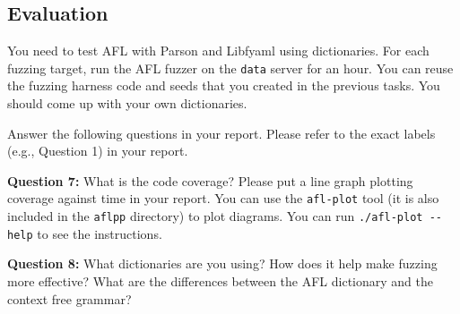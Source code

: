 \documentclass[letterpaper,11pt]{article}
\begin{document}




\subsection{Evaluation}

You need to test AFL with Parson and Libfyaml using dictionaries.
For each fuzzing target, run the AFL fuzzer on the \texttt{data} server for an hour.
You can reuse the fuzzing harness code and seeds that you created in the previous tasks.
You should come up with your own dictionaries.

Answer the following questions in your report. Please refer to the exact labels (e.g., Question 1) in your report.

\textbf{Question 7:}
What is the code coverage?
Please put a line graph plotting coverage against time in your report.
You can use the \texttt{afl-plot} tool (it is also included in the \texttt{aflpp} directory) to plot diagrams. You can run \texttt{./afl-plot {-}{-}help} to see the instructions.

\textbf{Question 8:}
What dictionaries are you using? How does it help make fuzzing more effective?
What are the differences between the AFL dictionary and the context free grammar?





\end{document}

